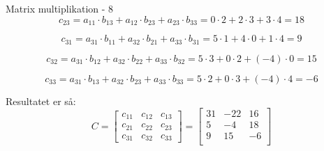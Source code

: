 \documentclass{article}
\begin{document}
\begin{exercise}{Matrix multiplikation - 8}
	\hint
	\[
		c_{23} = a_{11} \cdot b_{13} + a_{12} \cdot b_{23} + a_{23} \cdot b_{33}   = 0 \cdot 2 + 2 \cdot 3 + 3 \cdot 4 = 18
	\]
	
	\hint
	\[
		c_{31} = a_{31} \cdot b_{11} + a_{32} \cdot b_{21} + a_{33} \cdot b_{31} = 5 \cdot 1 + 4 \cdot 0 + 1 \cdot 4 = 9
	\]	
	
	\hint
	\[
		c_{32} = a_{31} \cdot b_{12} + a_{32} \cdot b_{22} + a_{33} \cdot b_{32}  = 5 \cdot 3 + 0 \cdot 2 + (-4) \cdot 0 = 15
	\]
	
	\hint
	\[
		c_{33} = a_{31} \cdot b_{13} + a_{32} \cdot b_{23} + a_{33} \cdot b_{33} = 5 \cdot 2 + 0 \cdot 3 + (-4) \cdot 4 = -6
	\]	
	
	
	
	\hint
	Resultatet er så:
	\[
	C = \left[\begin{array}{rrr}
	c_{11} & c_{12} & c_{13} \\
	c_{21} & c_{22} & c_{23} \\
	c_{31} & c_{32} & c_{33}
	\end{array} \right] = 
	\left[\begin{array}{rrr}
	31 & -22 & 16 \\
	5 & -4 & 18 \\
	9 & 15 & -6 \\
	\end{array} \right]
	\]
	
	
\end{exercise}

\newpage
\end{document}
